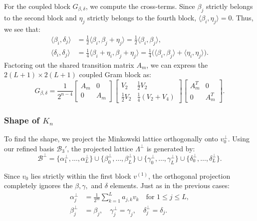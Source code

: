 \documentclass{amsart}
\theoremstyle{plain}
\theoremstyle{definition}
\theoremstyle{remark}
\numberwithin{equation}{section}
\begin{document}
For the coupled block $G_{\beta, \delta}$, we compute the cross-terms. Since $\beta_j$ strictly belongs to the second block and $\eta_j$ strictly belongs to the fourth block, $\langle \beta_i, \eta_j \rangle = 0$. Thus, we see that:
\begin{align*}
    \langle \beta_i, \delta_j \rangle &= \frac{1}{2} \langle \beta_i, \beta_j + \eta_j \rangle = \frac{1}{2} \langle \beta_i, \beta_j \rangle, \\
    \langle \delta_i, \delta_j \rangle &= \frac{1}{4} \langle \beta_i + \eta_i, \beta_j + \eta_j \rangle = \frac{1}{4} \bigl( \langle \beta_i, \beta_j \rangle + \langle \eta_i, \eta_j \rangle \bigr).
\end{align*}
Factoring out the shared transition matrix $A_m$, we can express the $2(L+1) \times 2(L+1)$ coupled Gram block as:
\[
    G_{\beta, \delta} = \frac{1}{2^{n-4}} 
    \begin{bmatrix} A_m & 0 \\ 0 & A_m \end{bmatrix} 
    \begin{bmatrix} V_2 & \frac{1}{2} V_2 \\ \frac{1}{2} V_2 & \frac{1}{4}(V_2 + V_4) \end{bmatrix} 
    \begin{bmatrix} A_m^T & 0 \\ 0 & A_m^T \end{bmatrix}.
\]

\subsubsection*{Shape of \texorpdfstring{$K_n$}{Kn}}

To find the shape, we project the Minkowski lattice orthogonally onto $v_0^\perp$. Using our refined basis $\mathcal{B}_3'$, the projected lattice $\Lambda^\perp$ is generated by:
\[
    \mathcal{B}^\perp = \{\alpha_1^\perp, \ldots, \alpha_L^\perp\} \cup \{\beta_0^\perp, \ldots, \beta_L^\perp\} \cup \{\gamma_0^\perp, \ldots, \gamma_L^\perp\} \cup \{\delta_0^\perp, \ldots, \delta_L^\perp\}.
\]

Since $v_0$ lies strictly within the first block $v^{(1)}$, the orthogonal projection completely ignores the $\beta, \gamma,$ and $\delta$ elements. Just as in the previous cases:
\begin{align*}
    \alpha_j^\perp &= \frac{1}{2^m} \sum_{k=1}^L a_{j,k} v_k \quad \text{for } 1 \leq j \leq L, \\
    \beta_j^\perp &= \beta_j, \quad \gamma_j^\perp = \gamma_j, \quad \delta_j^\perp = \delta_j.
\end{align*}
\end{document}
